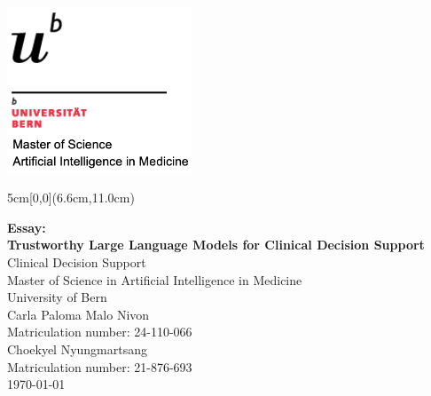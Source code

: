 \documentclass[12pt,a4paper]{scrreprt}
\begin{document}
\begin{titlepage}
  \begin{flushright}
    \includegraphics[width=5.5cm]{university_logo.png} %
  \end{flushright}
	\begin{textblock*}{5cm}[0,0](6.6cm,11.0cm)
	\end{textblock*}
	\begin{center}
		\vspace*{0.5cm}
    \Huge{\textbf{Essay:}}\\
		\Huge{\textbf{Trustworthy Large Language Models for Clinical Decision Support}}\\
    \vspace{3em}
		\Large{Clinical Decision Support}\\
    \vspace{0.5em}
    \normalsize Master of Science in Artificial Intelligence in Medicine\\
    \normalsize University of Bern\\
		\vspace{5em}
        \Large{Carla Paloma Malo Nivon}\\
        \vspace{0.5em}
        \normalsize Matriculation number: 24-110-066\\
        \vspace{4em}
        \Large{Choekyel Nyungmartsang}\\
        \vspace{0.5em}
        \normalsize Matriculation number: 21-876-693\\
		\vfill
        \Large{\today}\\

    
	\end{center}
 
\end{titlepage}
\end{document}
